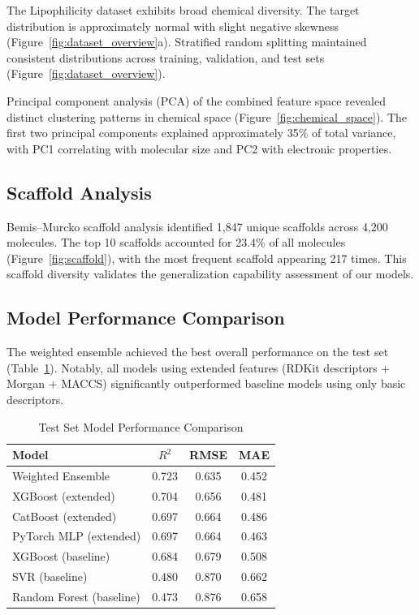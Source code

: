 \documentclass[12pt,a4paper]{article}
\begin{document}
The Lipophilicity dataset exhibits broad chemical diversity. The target distribution is approximately normal with slight negative skewness (Figure~\ref{fig:dataset_overview}a). Stratified random splitting maintained consistent distributions across training, validation, and test sets (Figure~\ref{fig:dataset_overview}).

Principal component analysis (PCA) of the combined feature space revealed distinct clustering patterns in chemical space (Figure~\ref{fig:chemical_space}). The first two principal components explained approximately 35\% of total variance, with PC1 correlating with molecular size and PC2 with electronic properties.

\subsection{Scaffold Analysis}

Bemis--Murcko scaffold analysis \citep{bemis1996properties} identified 1,847 unique scaffolds across 4,200 molecules. The top 10 scaffolds accounted for 23.4\% of all molecules (Figure~\ref{fig:scaffold}), with the most frequent scaffold appearing 217 times. This scaffold diversity validates the generalization capability assessment of our models.

\subsection{Model Performance Comparison}

The weighted ensemble achieved the best overall performance on the test set (Table~\ref{tab:model_performance}). Notably, all models using extended features (RDKit descriptors + Morgan + MACCS) significantly outperformed baseline models using only basic descriptors.

\begin{table}[H]
\centering
\caption{Test Set Model Performance Comparison}
\begin{tabular}{lccc}
\toprule
Model & $R^2$ & RMSE & MAE \\
\midrule
Weighted Ensemble & 0.723 & 0.635 & 0.452 \\
XGBoost (extended) & 0.704 & 0.656 & 0.481 \\
CatBoost (extended) & 0.697 & 0.664 & 0.486 \\
PyTorch MLP (extended) & 0.697 & 0.664 & 0.463 \\
XGBoost (baseline) & 0.684 & 0.679 & 0.508 \\
SVR (baseline) & 0.480 & 0.870 & 0.662 \\
Random Forest (baseline) & 0.473 & 0.876 & 0.658 \\
\bottomrule
\end{tabular}
\label{tab:model_performance}
\end{table}
\end{document}
